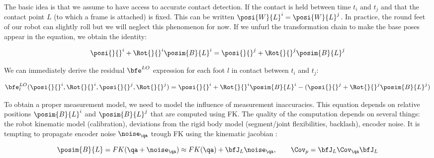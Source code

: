 The basic idea is that we assume to have access to accurate contact detection. If the contact is held between time $t_i$ and $t_j$ and that
the contact point $L$ (to which a frame is attached) is fixed. This can be written $\posi{W}{L}^i = \posi{W}{L}^j$. 
In practice, the round feet of our robot can slightly roll but we will neglect this phenomenon for now. 
If we unfurl the transformation chain to make the base poses appear in the equation, we obtain the identity:

\begin{equation}
    \posi{}{}^i + \Rot{}{}^i \posim{B}{L}^i = \posi{}{}^j + \Rot{}{}^j \posim{B}{L}^j
\end{equation}

We can immediately derive the residual $\bfe^{LO}$ expression for each foot $l$ in contact between $t_i$ and $t_j$:

\begin{equation}
    \bfe^{LO}_l(\posi{}{}^i, \Rot{}{}^i, \posi{}{}^j, \Rot{}{}^j) = \posi{}{}^i + \Rot{}{}^i \posim{B}{L}^i - (\posi{}{}^j + \Rot{}{}^j \posim{B}{L}^j)
\end{equation}

To obtain a proper measurement model, we need to model the influence of measurement inaccuracies.
This equation depends on relative positions $\posim{B}{L}^i$ and $\posim{B}{L}^j$ that are computed using FK. The quality of the computation depends on several things:
the robot kinematic model (calibration), deviations from the rigid body model (\eg segment/joint flexibilities, backlash), encoder noise.
It is tempting to propagate encoder noise $\noise_{\qa}$ trough FK using the kinematic jacobian \cite{bloesch2013state, hartley2018legged}:

\begin{equation}
    \posim{B}{L} = FK(\qa + \noise_{\qa}) \approx FK(\qa) + \bfJ_L\noise_{\qa}, \quad \quad \Cov_{p} = \bfJ_L \Cov_{\qa} \bfJ_L
\end{equation}

